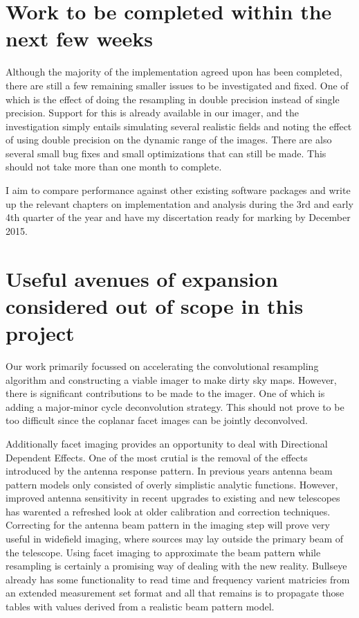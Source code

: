 \documentclass[a4paper,10pt]{article}
\begin{document}
\section{Work to be completed within the next few weeks}
Although the majority of the implementation agreed upon has been completed, there are still a few remaining smaller issues to be investigated and fixed. One of which is
the effect of doing the resampling in double precision instead of single precision. Support for this is already available in our imager, and the investigation simply entails
simulating several realistic fields and noting the effect of using double precision on the dynamic range of the images. There are also several small bug fixes and small 
optimizations that can still be made. This should not take more than one month to complete.

I aim to compare performance against other existing software packages and write up the relevant chapters on implementation and analysis during the 3rd and early 4th quarter
of the year and have my discertation ready for marking by December 2015. 
\section{Useful avenues of expansion considered out of scope in this project}
Our work primarily focussed on accelerating the convolutional resampling algorithm and constructing a viable imager to make dirty sky maps. However, there is significant
contributions to be made to the imager. One of which is adding a major-minor cycle deconvolution strategy. This should not prove to be too difficult since
the coplanar facet images can be jointly deconvolved.

Additionally facet imaging provides an opportunity to deal with Directional Dependent Effects. One of the most crutial is the removal of the effects introduced by the antenna
response pattern. In previous years antenna beam pattern models only consisted of overly simplistic analytic functions. However, improved antenna sensitivity in recent upgrades to
existing and new telescopes has warented a refreshed look at older calibration and correction techniques. Correcting for the antenna beam pattern in the imaging step will prove very
useful in widefield imaging, where sources may lay outside the primary beam of the telescope. Using facet imaging to approximate the beam pattern while resampling is certainly a promising
way of dealing with the new reality. Bullseye already has some functionality to read time and frequency varient matricies from an extended measurement set format and all that remains is to
propagate those tables with values derived from a realistic beam pattern model.
\end{document}

